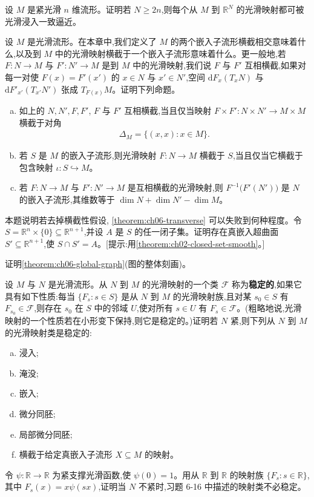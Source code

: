 \documentclass[../../main.tex]{subfiles}
\begin{document}
\begin{exercise}\label{exercise:ch06-12}
设 $M$ 是紧光滑 $n$ 维流形。证明若 $N\geqslant 2n$,则每个从 $M$ 到 $\mathbb{R}^N$ 的光滑映射都可被光滑浸入一致逼近。
\end{exercise}

\begin{exercise}\label{exercise:ch06-13}
设 $M$ 是光滑流形。在本章中,我们定义了 $M$ 的两个嵌入子流形横截相交意味着什么,以及到 $M$ 中的光滑映射横截于一个嵌入子流形意味着什么。更一般地,若 $F:N\to M$ 与 $F':N'\to M$ 是到 $M$ 中的光滑映射,我们说 $F$ 与 $F'$ 互相横截,如果对每一对使 $F(x)=F'(x')$ 的 $x\in N$ 与 $x'\in N'$,空间 $\mathrm{d}F_x(T_xN)$ 与 $\mathrm{d}F'_{x'}(T_{x'}N')$ 张成 $T_{F(x)}M$。证明下列命题。
\begin{enumerate}[(a)]
\item 如上的 $N,N',F,F'$, $F$ 与 $F'$ 互相横截,当且仅当映射 $F\times F':N\times N'\to M\times M$ 横截于对角
\begin{align*}
\Delta_M=\{(x,x):x\in M\}.
\end{align*}
\item 若 $S$ 是 $M$ 的嵌入子流形,则光滑映射 $F:N\to M$ 横截于 $S$,当且仅当它横截于包含映射 $\iota:S\hookrightarrow M$。
\item 若 $F:N\to M$ 与 $F':N'\to M$ 是互相横截的光滑映射,则 $F^{-1}\bigl(F'(N')\bigr)$ 是 $N$ 的嵌入子流形,其维数等于 $\dim N+\dim N'-\dim M$。
\end{enumerate}
\end{exercise}

\begin{exercise}\label{exercise:ch06-14}
本题说明若去掉横截性假设, \cref{theorem:ch06-transverse} 可以失败到何种程度。令 $S=\mathbb{R}^n\times\{0\}\subseteq\mathbb{R}^{n+1}$,并设 $A$ 是 $S$ 的任一闭子集。证明存在真嵌入超曲面 $S'\subseteq\mathbb{R}^{n+1}$,使 $S\cap S'=A$。[提示:用\cref{theorem:ch02-closed-set-smooth}。]
\end{exercise}

\begin{exercise}\label{exercise:ch06-15}
证明\cref{theorem:ch06-global-graph}(图的整体刻画)。
\end{exercise}

\begin{exercise}\label{exercise:ch06-16}
设 $M$ 与 $N$ 是光滑流形。从 $N$ 到 $M$ 的光滑映射的一个类 $\mathcal{F}$ 称为\textbf{稳定的},如果它具有如下性质:每当 $\{F_s:s\in S\}$ 是从 $N$ 到 $M$ 的光滑映射族,且对某 $s_0\in S$ 有 $F_{s_0}\in\mathcal{F}$,则存在 $s_0$ 在 $S$ 中的邻域 $U$,使对所有 $s\in U$ 有 $F_s\in\mathcal{F}$。(粗略地说,光滑映射的一个性质若在小形变下保持,则它是稳定的。)证明若 $N$ 紧,则下列从 $N$ 到 $M$ 的光滑映射类是稳定的:
\begin{enumerate}[(a)]
\item 浸入;
\item 淹没;
\item 嵌入;
\item 微分同胚;
\item 局部微分同胚;
\item 横截于给定真嵌入子流形 $X\subseteq M$ 的映射。
\end{enumerate}
\end{exercise}

\begin{exercise}\label{exercise:ch06-17}
令 $\psi:\mathbb{R}\to\mathbb{R}$ 为紧支撑光滑函数,使 $\psi(0)=1$。用从 $\mathbb{R}$ 到 $\mathbb{R}$ 的映射族 $\{F_s:s\in\mathbb{R}\}$,其中 $F_s(x)=x\psi(sx)$,证明当 $N$ 不紧时,习题 6-16 中描述的映射类不必稳定。
\end{exercise}
\end{document}
